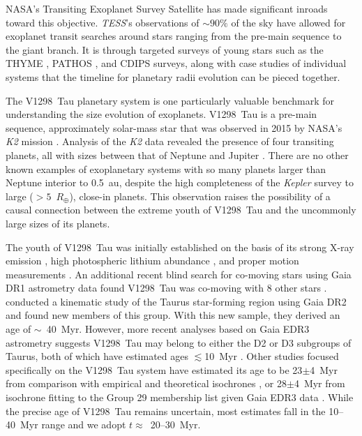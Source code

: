 \documentclass[twocolumn]{aastex631}
\newcommand{\tess}{\textit{TESS}}
\newcommand{\sname}{V1298~Tau\xspace}
\newcommand{\rearth}{$R_\oplus$\xspace}
\begin{document}
NASA's Transiting Exoplanet Survey Satellite \citep[\tess;][]{Ricker2015} has made significant inroads toward this objective. \tess's observations of $\sim 90 \%$ of the sky have allowed for exoplanet transit searches around stars ranging from the pre-main sequence to the giant branch. It is through targeted surveys of young stars such as the THYME \citep[e.g.][]{Newton2019}, PATHOS \citep[e.g.][]{Nardiello2020}, and CDIPS \citep[e.g.][]{Bouma2020} surveys, along with case studies of individual systems \citep[e.g.][]{benatti19, Plavchan2020, Hedges2021, Zhou2021} that the timeline for planetary radii evolution can be pieced together. 

The \sname planetary system is one particularly valuable benchmark for understanding the size evolution of exoplanets. \sname is a pre-main sequence, approximately solar-mass star that was observed in 2015 by NASA's \textit{K2} mission \citep{Howell2014}. Analysis of the \textit{K2} data revealed the presence of four transiting planets, all with sizes between that of Neptune and Jupiter \citep{David2019a, David2019b}. There are no other known examples of exoplanetary systems with so many planets larger than Neptune interior to 0.5~au, despite the high completeness of the \textit{Kepler} survey to large ($>5$~\rearth), close-in planets. This observation raises the possibility of a causal connection between the extreme youth of \sname and the uncommonly large sizes of its planets.  

The youth of \sname was initially established on the basis of its strong X-ray emission \citep{Wichmann1996}, high photospheric lithium abundance \citep{Wichmann2000}, and proper motion measurements \citep{frink1997}. An additional recent blind search for co-moving stars using Gaia DR1 astrometry data found \sname was co-moving with 8 other stars \citep[Group 29 in][]{Oh2017}. \cite{Luhman2018} conducted a kinematic study of the Taurus star-forming region using Gaia DR2 and found new members of this group. With this new sample, they derived an age of $\sim$~40~Myr. However, more recent analyses based on Gaia EDR3 astrometry suggests \sname may belong to either the D2 or D3 subgroups of Taurus, both of which have estimated ages $\lesssim$10~Myr \citep{gaidos21, Krolikowski2021}. Other studies focused specifically on the \sname system have estimated its age to be 23$\pm$4~Myr from comparison with empirical and theoretical isochrones \citep{David2019b}, or 28$\pm$4~Myr from isochrone fitting to the \citet{Luhman2018} Group 29 membership list given Gaia EDR3 data \citep{johnson21}. While the precise age of \sname remains uncertain, most estimates fall in the 10--40~Myr range and we adopt $t \approx$~20--30~Myr.
\end{document}
